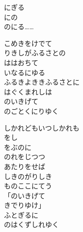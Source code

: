 \documentclass[10pt,b5j]{tarticle} %
\begin{document}
\vspace{1.5em} %
\newcommand{\linespace}{0.5em} %
\newcommand{\blocksize}{0.5\hsize} %
\begin{enumerate} %
    \begin{minipage}[c]{\blocksize}
    
        \vspace{\linespace}
        \item
        にぎる\\
        にの\\
        のにる……
        
        \vspace{\linespace}
        \item
        こめきをけでて\\
        りきしがふるさとの\\
        ははおちて\\
        いなるにゆる\\
        ふるきよききふるさとに\\
        はぐくまれしは\\
        のいきげて\\
        のごとくにりゆく
        
        \vspace{\linespace}
        \item
        しかれどもいつしかれも\\
        をし\\
        をぶのに\\
        のれをじつつ\\
        あたりをせば\\
        しきのがりしき\\
        ものここにてう\\
        「のいきげて\\
        きでりゆけ」\\
        ふとぎるに\\
        のはくずしれゆく
    
    \end{minipage}
\end{enumerate} %
\end{document}
